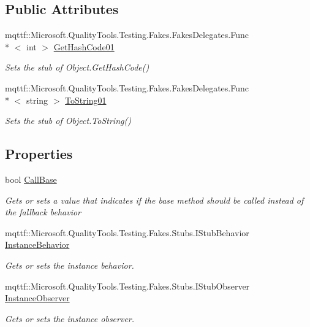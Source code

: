 \subsection*{Public Attributes}
\begin{DoxyCompactItemize}
\item 
mqttf\-::\-Microsoft.\-Quality\-Tools.\-Testing.\-Fakes.\-Fakes\-Delegates.\-Func\\*
$<$ int $>$ \hyperlink{class_system_1_1_fakes_1_1_stub_object_acbae848277d8f4226b4b09571d143a57}{Get\-Hash\-Code01}
\begin{DoxyCompactList}\small\item\em Sets the stub of Object.\-Get\-Hash\-Code()\end{DoxyCompactList}\item 
mqttf\-::\-Microsoft.\-Quality\-Tools.\-Testing.\-Fakes.\-Fakes\-Delegates.\-Func\\*
$<$ string $>$ \hyperlink{class_system_1_1_fakes_1_1_stub_object_a549895b00b621884d95b4b00f7bcd81a}{To\-String01}
\begin{DoxyCompactList}\small\item\em Sets the stub of Object.\-To\-String()\end{DoxyCompactList}\end{DoxyCompactItemize}
\subsection*{Properties}
\begin{DoxyCompactItemize}
\item 
bool \hyperlink{class_system_1_1_fakes_1_1_stub_object_a7514c95b73c0358431e51bb7df9b009e}{Call\-Base}
\begin{DoxyCompactList}\small\item\em Gets or sets a value that indicates if the base method should be called instead of the fallback behavior\end{DoxyCompactList}\item 
mqttf\-::\-Microsoft.\-Quality\-Tools.\-Testing.\-Fakes.\-Stubs.\-I\-Stub\-Behavior \hyperlink{class_system_1_1_fakes_1_1_stub_object_a2df717840141c132373528b296fba7ec}{Instance\-Behavior}
\begin{DoxyCompactList}\small\item\em Gets or sets the instance behavior.\end{DoxyCompactList}\item 
mqttf\-::\-Microsoft.\-Quality\-Tools.\-Testing.\-Fakes.\-Stubs.\-I\-Stub\-Observer \hyperlink{class_system_1_1_fakes_1_1_stub_object_af56dd62c66055be575b998b81998989e}{Instance\-Observer}
\begin{DoxyCompactList}\small\item\em Gets or sets the instance observer.\end{DoxyCompactList}\end{DoxyCompactItemize}


